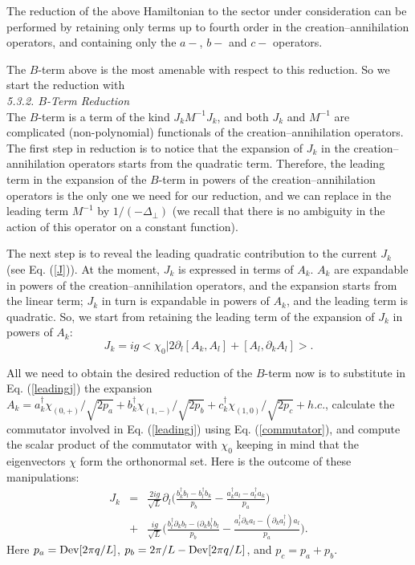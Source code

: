 \documentclass[a4paper,12pt]{article}
\begin{document}
The reduction of the above Hamiltonian to the sector under 
consideration can be performed by retaining only terms up 
to fourth order in the creation--annihilation 
operators, and containing only the $a-$, $b-$ and $c-$ operators.

The $B$-term above is the most amenable with respect to this reduction. 
So we start the reduction with\\

{\it 5.3.2. $B$-Term Reduction }\\

The $B$-term is a term of the kind  $J_kM^{-1}J_k$, and both 
$J_k$ and $M^{-1}$ are complicated 
(non-polynomial) functionals 
of the creation--annihilation operators. The first step in reduction 
is to notice that the expansion of $J_k$ in the 
creation--annihilation operators starts from the quadratic term. 
Therefore, the leading term in the expansion of the $B$-term 
in powers of the creation--annihilation operators is 
the only one we need for our reduction, and we can 
replace in the leading term $M^{-1}$ by $1/(-\Delta_\perp)$ 
(we recall that there is no ambiguity in the action of 
this operator on a constant function).

The next step is to reveal the leading quadratic contribution to the 
current $J_k$ (see Eq. (\ref{J})).
At the moment, $J_k$ is expressed in terms of $A_k$. $A_k$ 
are expandable in powers of the creation--annihilation operators, 
and the expansion starts from the 
linear term; $J_k$ in turn is expandable in powers of $A_k$, 
and the leading term is quadratic. So, we start from retaining 
the leading term of the expansion of $J_k$ 
in powers of $A_k$:
\begin{equation}
\label{leadingj}
J_k =ig<\chi_0|2\partial_l[A_k,A_l] + [A_l,\partial_kA_l]>.
\end{equation}

All we need to obtain the desired reduction of the $B$-term now is to 
substitute in Eq. (\ref{leadingj}) the expansion 
$A_k=a^\dagger_k\chi_{(0,+)}/\sqrt{2p_a} +
b^\dagger_k\chi_{(1,-)}/\sqrt{2p_b}
+c^\dagger_k\chi_{(1,0)}/\sqrt{2p_c} + h.c.$, 
calculate the commutator involved in Eq. (\ref{leadingj}) 
using Eq. (\ref{commutator}), and compute
the scalar product of the commutator with $\chi_0$ keeping in 
mind that the eigenvectors $\chi$ form the orthonormal set.
Here is the outcome of these manipulations:
\begin{eqnarray}
\label{reducedcurrent}
J_k &=&\frac{2ig}{\sqrt{L}}\partial_l \bigg(\frac{b^\dagger_kb_l-
b^\dagger_lb_k}{p_b} -
\frac{a^\dagger_ka_l-a^\dagger_la_k}{p_a} \bigg) \nonumber\\
& + & \frac{ig}{\sqrt{L}} \bigg(\frac{b^\dagger_l\partial_kb_l - 
(\partial_kb^\dagger_l b_l}{p_b} -
\frac{a^\dagger_l\partial_ka_l - (\partial_ka^\dagger_l)a_l}{p_a} \bigg).
\end{eqnarray}
Here 
$p_a = {\rm Dev}[2\pi q/L]$, $p_b = 2\pi/L - {\rm Dev}[2\pi q/L]$, 
and $p_c = p_a + p_b$.
\end{document}
